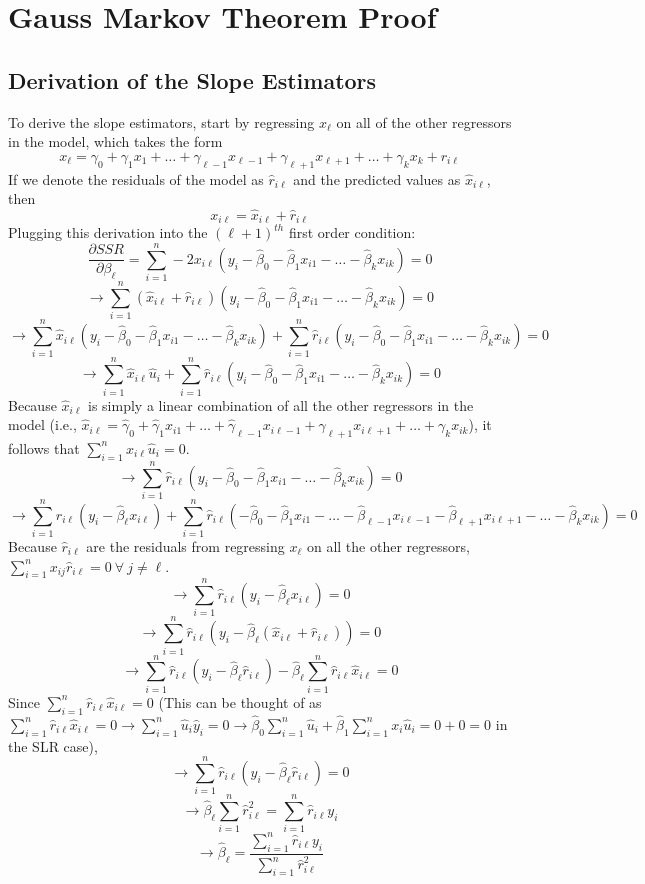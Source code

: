 \documentclass[11pt]{article}
\begin{document}
\section*{Gauss Markov Theorem Proof}
\subsection*{Derivation of the Slope Estimators}
To derive the slope estimators, start by regressing $x_\ell$ on all of the other regressors in the model, which takes the form$$x_\ell=\gamma_0+\gamma_1x_1+\dots+\gamma_{\ell-1}x_{\ell-1}+\gamma_{\ell+1}x_{\ell+1}+\dots+\gamma_{k}x_{k}+r_{i\ell}$$If we denote the residuals of the model as $\hat{r}_{i\ell}$ and the predicted values as $\hat{x}_{i\ell}$, then$$x_{i\ell}=\hat{x}_{i\ell}+\hat{r}_{i\ell}$$Plugging this derivation into the $(\ell+1)^{th}$ first order condition:
$$\frac{\partial{SSR}}{\partial{\beta_\ell}}=\sum_{i=1}^{n}-2x_{i\ell}\left(y_i-\hat{\beta}_0-\hat{\beta}_1x_{i1}-\dots-\hat{\beta}_kx_{ik}\right)=0$$
$$\to\sum_{i=1}^{n}\left(\hat{x}_{i\ell}+\hat{r}_{i\ell}\right)\left(y_i-\hat{\beta}_0-\hat{\beta}_1x_{i1}-\dots-\hat{\beta}_kx_{ik}\right)=0$$
$$\to\sum_{i=1}^{n}\hat{x}_{i\ell}\left(y_i-\hat{\beta}_0-\hat{\beta}_1x_{i1}-\dots-\hat{\beta}_kx_{ik}\right)+\sum_{i=1}^{n}\hat{r}_{i\ell}\left(y_i-\hat{\beta}_0-\hat{\beta}_1x_{i1}-\dots-\hat{\beta}_kx_{ik}\right)=0$$
$$\to\sum_{i=1}^{n}\hat{x}_{i\ell}\hat{u}_i+\sum_{i=1}^{n}\hat{r}_{i\ell}\left(y_i-\hat{\beta}_0-\hat{\beta}_1x_{i1}-\dots-\hat{\beta}_kx_{ik}\right)=0$$
Because $\hat{x}_{i\ell}$ is simply a linear combination of all the other regressors in the model (i.e., $\hat{x}_{i\ell}=\hat{\gamma}_0+\hat{\gamma}_1x_{i1}+\dots+\hat{\gamma}_{\ell-1}x_{i\ell-1}+\gamma_{\ell+1}x_{i\ell+1}+\dots+\gamma_{k}x_{ik}$), it follows that $\sum_{i=1}^{n}\hat{x}_{i\ell}\hat{u}_i=0$.
$$\to\sum_{i=1}^{n}\hat{r}_{i\ell}\left(y_i-\hat{\beta}_0-\hat{\beta}_1x_{i1}-\dots-\hat{\beta}_kx_{ik}\right)=0$$
$$\to\sum_{i=1}^{n}\hat{r}_{i\ell}\left(y_i-\hat{\beta}_\ell x_{i\ell}\right) +\sum_{i=1}^{n}\hat{r}_{i\ell}\left(-\hat{\beta}_0-\hat{\beta}_1x_{i1}-\dots-\hat{\beta}_{\ell-1}x_{i\ell-1}-\hat{\beta}_{\ell+1}x_{i\ell+1}-\dots-\hat{\beta}_kx_{ik}\right)=0$$
Because $\hat{r}_{i\ell}$ are the residuals from regressing $x_\ell$ on all the other regressors, $\sum_{i=1}^{n}x_{ij}\hat{r}_{i\ell}=0\ \forall\ j\neq \ell$.
$$\to\sum_{i=1}^{n}\hat{r}_{i\ell}\left(y_i-\hat{\beta}_\ell x_{i\ell}\right)=0$$
$$\to\sum_{i=1}^{n}\hat{r}_{i\ell}\left(y_i-\hat{\beta}_\ell\left(\hat{x}_{i\ell}+\hat{r}_{i\ell}\right)\right)=0$$
$$\to\sum_{i=1}^{n}\hat{r}_{i\ell}\left(y_i-\hat{\beta}_\ell\hat{r}_{i\ell}\right)-\hat{\beta}_\ell\sum_{i=1}^{n}\hat{r}_{i\ell}\hat{x}_{i\ell}=0$$
Since $\sum_{i=1}^{n}\hat{r}_{i\ell}\hat{x}_{i\ell}=0$ (This can be thought of as $\sum_{i=1}^{n}\hat{r}_{i\ell}\hat{x}_{i\ell}=0\to\sum_{i=1}^{n}\hat{u}_{i}\hat{y}_{i}=0\to\hat{\beta}_0\sum_{i=1}^{n}\hat{u}_{i}+\hat{\beta}_1\sum_{i=1}^{n}x_i\hat{u}_{i}=0+0=0$ in the SLR case),
$$\to\sum_{i=1}^{n}\hat{r}_{i\ell}\left(y_i-\hat{\beta}_\ell\hat{r}_{i\ell}\right)=0$$
$$\to\hat{\beta}_\ell\sum_{i=1}^{n}\hat{r}_{i\ell}^2=\sum_{i=1}^{n}\hat{r}_{i\ell}y_i$$
$$\to\hat{\beta}_\ell=\frac{\sum_{i=1}^{n}\hat{r}_{i\ell}y_i}{\sum_{i=1}^{n}\hat{r}_{i\ell}^2}$$
\end{document}
